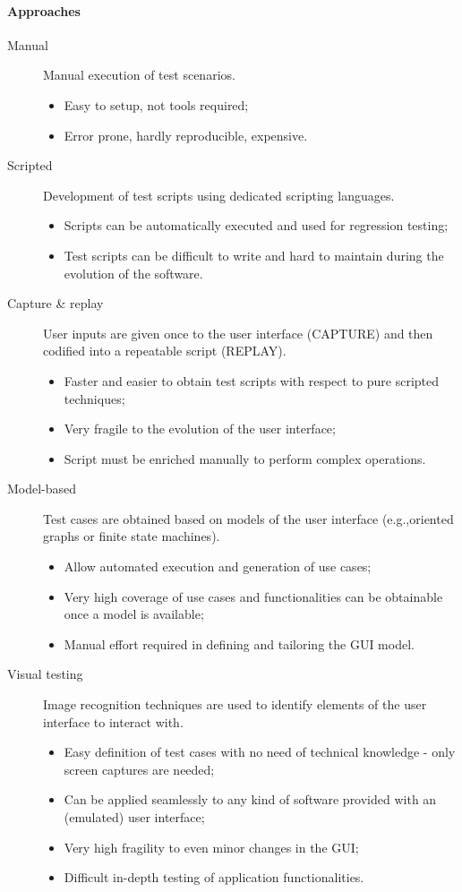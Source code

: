 \paragraph{Approaches}
\begin{description}
\item [Manual] Manual execution of test scenarios.
\begin{itemize}
\item Easy to setup, not tools required;
\item Error prone, hardly reproducible, expensive.
\end{itemize}
\item [Scripted] Development of test scripts using dedicated scripting languages.
\begin{itemize}
\item Scripts can be automatically executed and used for regression testing;
\item Test scripts can be difficult to write and hard to maintain during the evolution of the software.
\end{itemize}
\item [Capture \& replay] User inputs are given once to the user interface (CAPTURE) and then codified into a repeatable script (REPLAY).
\begin{itemize}
\item Faster and easier to obtain test scripts with respect to pure scripted techniques;
\item Very fragile to the evolution of the user interface;
\item Script must be enriched manually to perform complex operations.
\end{itemize}
\item [Model-based] Test cases are obtained based on models of the user interface (e.g.,\@ oriented graphs or finite state machines).
\begin{itemize}
\item Allow automated execution and generation of use cases;
\item Very high coverage of use cases and functionalities can be obtainable once a model is available;
\item Manual effort required in defining and tailoring the GUI model.
\end{itemize}
\item [Visual testing] Image recognition techniques are used to identify elements of the user interface to interact with.
\begin{itemize}
\item Easy definition of test cases with no need of technical knowledge - only screen captures are needed;
\item Can be applied seamlessly to any kind of software provided with an (emulated) user interface;
\item Very high fragility to even minor changes in the GUI;
\item Difficult in-depth testing of application functionalities.
\end{itemize}
\end{description}

